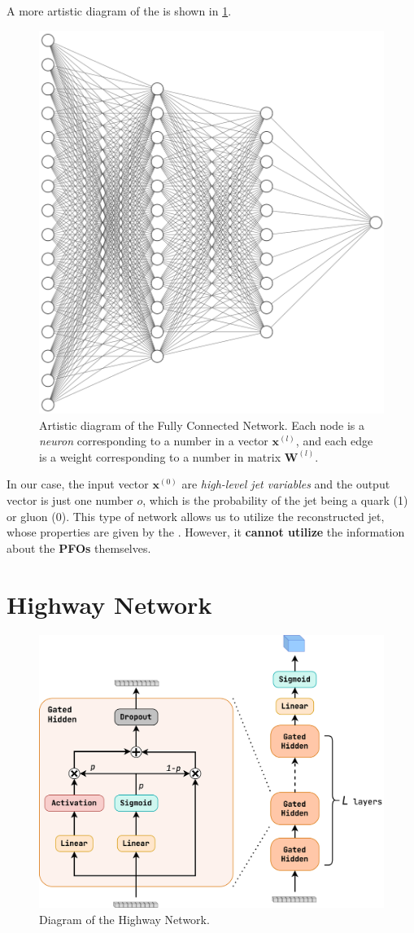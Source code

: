 A more artistic diagram of the \fc is shown in \cref{fig:fc2}.
\begin{figure}[htb]
    \centering
    \includegraphics[width=0.5\linewidth]{src/img/fc.png}
    \caption[Artistic diagram of the Fully Connected Network. Each node is a \emph{neuron} corresponding to a number in a vector $\pmb{x}^{(l)}$, and each edge is a weight corresponding to a number in matrix $\pmb{W}^{(l)}$.]{Artistic diagram of the Fully Connected Network\footnotemark. Each node is a \emph{neuron} corresponding to a number in a vector $\pmb{x}^{(l)}$, and each edge is a weight corresponding to a number in matrix $\pmb{W}^{(l)}$.}
    \label{fig:fc2}
\end{figure}

In our case, the input vector $\pmb{x}^{(0)}$ are \emph{high-level jet variables} and the output vector is just one number $o$, which is the probability of the jet being a quark (1) or gluon (0).
This type of network allows us to utilize the reconstructed jet, whose properties are given by the \PFOs.
However, it \textbf{cannot utilize} the information about the \textbf{PFOs} themselves.

\section{Highway Network}

\label{sec:highway}
\begin{figure}[htb]
    \centering
    \includegraphics[width=0.8\linewidth]{src/diagrams/highway.png}
    \caption{Diagram of the Highway Network.}
    \label{fig:highway}
\end{figure}

